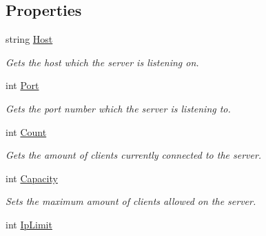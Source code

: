 \subsection*{Properties}
\begin{DoxyCompactItemize}
\item 
\hypertarget{classAsterion_1_1Server_a19bb5f819832c56f81bbc2db7b982e6d}{string \hyperlink{classAsterion_1_1Server_a19bb5f819832c56f81bbc2db7b982e6d}{Host}}\label{classAsterion_1_1Server_a19bb5f819832c56f81bbc2db7b982e6d}

\begin{DoxyCompactList}\small\item\em Gets the host which the server is listening on. \end{DoxyCompactList}\item 
\hypertarget{classAsterion_1_1Server_aa2820cd7ab117d9b0e624fb7c1ef762e}{int \hyperlink{classAsterion_1_1Server_aa2820cd7ab117d9b0e624fb7c1ef762e}{Port}}\label{classAsterion_1_1Server_aa2820cd7ab117d9b0e624fb7c1ef762e}

\begin{DoxyCompactList}\small\item\em Gets the port number which the server is listening to. \end{DoxyCompactList}\item 
\hypertarget{classAsterion_1_1Server_a755310aa1fb3da30e61963d3d60cb606}{int \hyperlink{classAsterion_1_1Server_a755310aa1fb3da30e61963d3d60cb606}{Count}}\label{classAsterion_1_1Server_a755310aa1fb3da30e61963d3d60cb606}

\begin{DoxyCompactList}\small\item\em Gets the amount of clients currently connected to the server. \end{DoxyCompactList}\item 
\hypertarget{classAsterion_1_1Server_adcdc6536b6eeaa3e4f7618775446a8f4}{int \hyperlink{classAsterion_1_1Server_adcdc6536b6eeaa3e4f7618775446a8f4}{Capacity}}\label{classAsterion_1_1Server_adcdc6536b6eeaa3e4f7618775446a8f4}

\begin{DoxyCompactList}\small\item\em Sets the maximum amount of clients allowed on the server. \end{DoxyCompactList}\item 
\hypertarget{classAsterion_1_1Server_ac2ff4d6107ed236a3db7ce68d0a7c81a}{int \hyperlink{classAsterion_1_1Server_ac2ff4d6107ed236a3db7ce68d0a7c81a}{Ip\-Limit}}\label{classAsterion_1_1Server_ac2ff4d6107ed236a3db7ce68d0a7c81a}


\end{DoxyCompactItemize}
